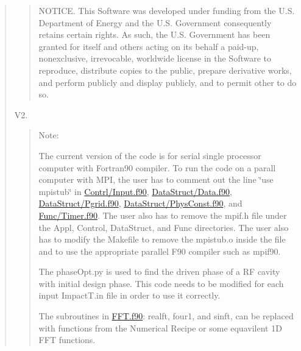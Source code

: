 \begin{quote}
\begin{quote}
N\+O\+T\+I\+CE. This Software was developed under funding from the U.\+S. Department of Energy and the U.\+S. Government consequently retains certain rights. As such, the U.\+S. Government has been granted for itself and others acting on its behalf a paid-\/up, nonexclusive, irrevocable, worldwide license in the Software to reproduce, distribute copies to the public, prepare derivative works, and perform publicly and display publicly, and to permit other to do so. \end{quote}




 V2. \begin{quote}
Note\+:
\begin{DoxyEnumerate}
\item The current version of the code is for serial single processor computer with Fortran90 compiler. To run the code on a parall computer with M\+PI, the user has to comment out the line \char`\"{}use mpistub\char`\"{} in \mbox{\hyperlink{_input_8f90}{Contrl/\+Input.\+f90}}, \mbox{\hyperlink{_data_8f90}{Data\+Struct/\+Data.\+f90}}, \mbox{\hyperlink{_pgrid_8f90}{Data\+Struct/\+Pgrid.\+f90}}, \mbox{\hyperlink{_phys_const_8f90}{Data\+Struct/\+Phys\+Const.\+f90}}, and \mbox{\hyperlink{_timer_8f90}{Func/\+Timer.\+f90}}. The user also has to remove the mpif.\+h file under the Appl, Control, Data\+Struct, and Func directories. The user also has to modify the Makefile to remove the mpistub.\+o inside the file and to use the appropriate parallel F90 compiler such as mpif90.
\item The phase\+Opt.\+py is used to find the driven phase of a RF cavity with initial design phase. This code needs to be modified for each input Impact\+T.\+in file in order to use it correctly.
\item The subroutines in \mbox{\hyperlink{_f_f_t_8f90}{F\+F\+T.\+f90}}\+: realft, four1, and sinft, can be replaced with functions from the Numerical Recipe or some equavilent 1D F\+FT functions. 
\end{DoxyEnumerate}\end{quote}
\end{quote}

